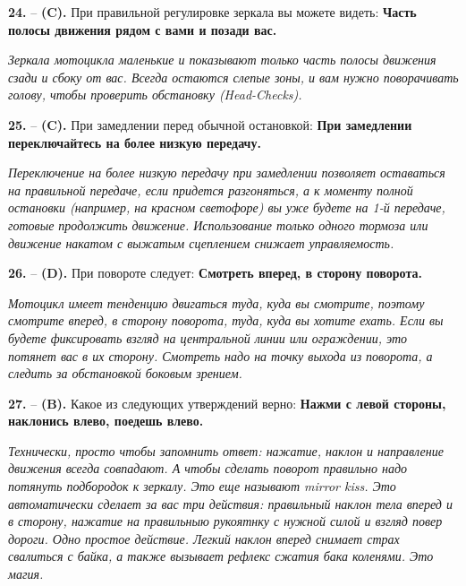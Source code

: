 \begin{minipage}{\linewidth}
\noindent\textbf{24.}  -- \textbf {(C).} При правильной регулировке зеркала вы можете видеть:  \textbf {Часть полосы движения рядом с вами и позади вас.} \par \textit {Зеркала мотоцикла маленькие и показывают только часть полосы движения сзади и сбоку от вас. Всегда остаются слепые зоны, и вам нужно поворачивать голову, чтобы проверить обстановку (Head-Checks).} \\
\end{minipage}

\begin{minipage}{\linewidth}
\noindent\textbf{25.}  -- \textbf {(C).} При замедлении перед обычной остановкой:  \textbf {При замедлении переключайтесь на более низкую передачу.} \par \textit {Переключение на более низкую передачу при замедлении позволяет оставаться на правильной передаче, если придется разгоняться, а к моменту полной остановки (например, на красном светофоре) вы уже будете на 1-й передаче, готовые  продолжить движение. Использование только одного тормоза или движение накатом с выжатым сцеплением снижает управляемость.} \\
\end{minipage}

\begin{minipage}{\linewidth}
\noindent\textbf{26.}  -- \textbf {(D).} При повороте следует:  \textbf {Смотреть вперед, в сторону поворота.} \par \textit {Мотоцикл имеет тенденцию двигаться туда, куда вы смотрите, поэтому смотрите вперед, в сторону поворота, туда, куда вы хотите ехать. Если вы будете фиксировать взгляд на центральной линии или ограждении, это потянет вас в их сторону. Смотреть надо на точку выхода из поворота, а следить за обстановкой боковым зрением.} \\
\end{minipage}

\begin{minipage}{\linewidth}
\noindent\textbf{27.}  -- \textbf {(B).} Какое из следующих утверждений верно:  \textbf {Нажми с левой стороны, наклонись влево, поедешь влево.} \par \textit {Технически, просто чтобы запомнить ответ: нажатие, наклон и направление движения всегда совпадают. А чтобы сделать поворот правильно надо потянуть подбородок к зеркалу. Это еще называют mirror kiss. Это автоматически сделает за вас три действия: правильный наклон тела вперед и в сторону, нажатие на правильныю рукоятнку с нужной силой и взгляд повер дороги. Одно простое действие. Легкий наклон вперед снимает страх свалиться с байка, а также вызывает рефлекс сжатия бака коленями. Это магия.} \\
\end{minipage}

